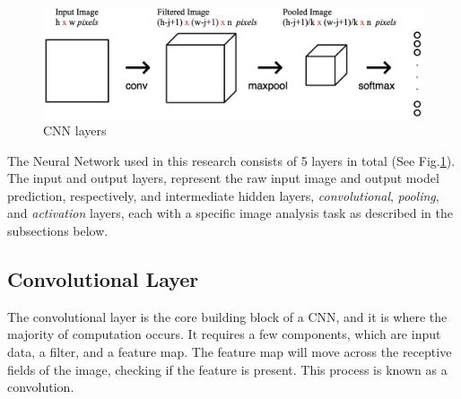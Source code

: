 \documentclass[conference]{IEEEtran}
\begin{document}
\begin{figure}[h]
  \centering
  \includegraphics[scale=0.2]{images/CNN_layers.png}
  \caption{CNN layers}
  \label{fig:Layers}
\end{figure}
\indent The Neural Network used in this research consists of 5 layers in total (See Fig.\ref{fig:Layers}). The input and output layers,
represent the raw input image and output model prediction, respectively, and intermediate hidden layers,
\textit{convolutional}, \textit{pooling}, and \textit{activation} layers, each with a specific image analysis task
as described in the subsections below.\cite{CNNPart1_VZ_2019}\\
\subsection{Convolutional Layer}

The convolutional layer is the core building block of a CNN, and it is where the majority of computation occurs. It requires a few components, which are input data, a filter, and a feature map. The feature map will move across the receptive fields of the image, checking if the feature is present. This process is known as a convolution.
\end{document}
